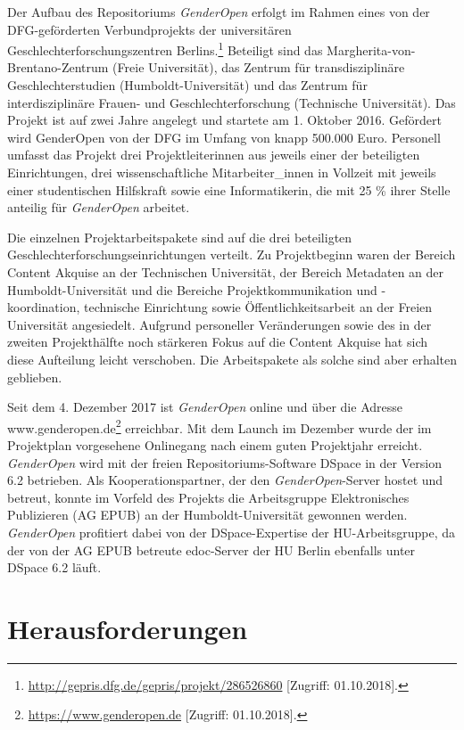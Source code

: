 \documentclass[a4paper,
fontsize=11pt,
oneside,
numbers=noperiodatend,
parskip=half-,
bibliography=totoc,
final
]{scrartcl}
\begin{document}
Der Aufbau des Repositoriums \emph{GenderOpen} erfolgt im Rahmen eines
von der DFG-geförderten Verbundprojekts der universitären
Geschlechterforschungszentren Berlins.\footnote{\url{http://gepris.dfg.de/gepris/projekt/286526860}
  {[}Zugriff: 01.10.2018{]}.} Beteiligt sind das
Margherita-von-Brentano-Zentrum (Freie Universität), das Zentrum für
transdisziplinäre Geschlechterstudien (Humboldt-Universität) und das
Zentrum für interdisziplinäre Frauen- und Geschlechterforschung
(Technische Universität). Das Projekt ist auf zwei Jahre angelegt und
startete am 1. Oktober 2016. Gefördert wird GenderOpen von der DFG im
Umfang von knapp 500.000 Euro. Personell umfasst das Projekt drei
Projektleiterinnen aus jeweils einer der beteiligten Einrichtungen, drei
wissenschaftliche Mitarbeiter\_innen in Vollzeit mit jeweils einer
studentischen Hilfskraft sowie eine Informatikerin, die mit 25 \% ihrer
Stelle anteilig für \emph{GenderOpen} arbeitet.

Die einzelnen Projektarbeitspakete sind auf die drei beteiligten
Geschlechterforschungseinrichtungen verteilt. Zu Projektbeginn waren der
Bereich Content Akquise an der Technischen Universität, der Bereich
Metadaten an der Humboldt-Universität und die Bereiche
Projektkommunikation und -koordination, technische Einrichtung sowie
Öffentlichkeitsarbeit an der Freien Universität angesiedelt. Aufgrund
personeller Veränderungen sowie des in der zweiten Projekthälfte noch
stärkeren Fokus auf die Content Akquise hat sich diese Aufteilung leicht
verschoben. Die Arbeitspakete als solche sind aber erhalten geblieben.

Seit dem 4. Dezember 2017 ist \emph{GenderOpen} online und über die
Adresse www.genderopen.de\footnote{\url{https://www.genderopen.de}
  {[}Zugriff: 01.10.2018{]}.} erreichbar. Mit dem Launch im Dezember
wurde der im Projektplan vorgesehene Onlinegang nach einem guten
Projektjahr erreicht. \emph{GenderOpen} wird mit der freien
Repositoriums-Software DSpace in der Version 6.2 betrieben. Als
Kooperationspartner, der den \emph{GenderOpen}-Server hostet und
betreut, konnte im Vorfeld des Projekts die Arbeitsgruppe Elektronisches
Publizieren (AG EPUB) an der Humboldt-Universität gewonnen werden.
\emph{GenderOpen} profitiert dabei von der DSpace-Expertise der
HU-Arbeitsgruppe, da der von der AG EPUB betreute edoc-Server der HU
Berlin ebenfalls unter DSpace 6.2 läuft.

\hypertarget{herausforderungen}{%
\section{Herausforderungen}\label{herausforderungen}}
\end{document}
